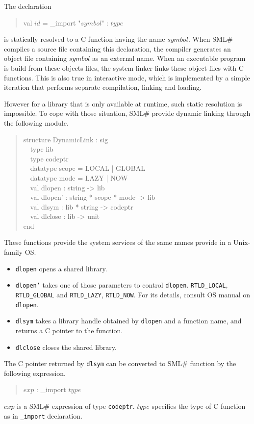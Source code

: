 \documentclass{jbook}
\newcommand{\smlsharp}{SML\#}
\newcommand{\myem}{\mbox{\ \ }}
\newenvironment{program}{\begin{quote}\begin{tt}}%
                        {\end{tt}\end{quote}}
\begin{document}
	The declaration
\begin{program}
val $\mathit{id}$ = \_import "$\mathit{symbol}$" : $\mathit{type}$
\end{program}
is statically resolved to a C function having the name $\mathit{symbol}$.
	When \smlsharp{} compiles a source file containing this
declaration, the compiler generates an object file containing $\mathit{symbol}$
as an external name.
	When an executable program is build from these objects files,
the system linker links these object files with C functions.
	This is also true in interactive mode, which is implemented by
a simple iteration that performs separate compilation, linking and
loading.

	However for a library that is only available at runtime, such
static resolution  is impossible.
	To cope with those situation, \smlsharp{} provide dynamic
linking through the following module.
\begin{program}
structure DynamicLink : sig\\
\myem  type lib\\
\myem  type codeptr\\
\myem  datatype scope = LOCAL | GLOBAL\\
\myem  datatype mode = LAZY | NOW\\
\myem  val dlopen : string -> lib\\
\myem  val dlopen' : string * scope * mode -> lib\\
\myem  val dlsym : lib * string -> codeptr\\
\myem  val dlclose : lib -> unit\\
end
\end{program}
	These functions provide the system services of the same names
provide in a Unix-family OS.
\begin{itemize}
\item  {\tt dlopen} opens a shared library.
\item  {\tt dlopen'} takes one of those parameters to control {\tt dlopen}.
{\tt RTLD\_LOCAL}, {\tt RTLD\_GLOBAL} and
{\tt RTLD\_LAZY}, {\tt RTLD\_NOW}.
	For its details, consult OS manual on {\tt dlopen}.
\item {\tt dlsym} takes a library handle obtained by {\tt dlopen}
and a function name, and returns a C pointer to the function.
\item  {\tt dlclose} closes the shared library.
\end{itemize}
	The C pointer returned by {\tt dlsym} can be converted to 
\smlsharp{} function by the following expression.
\begin{program}
$\mathit{exp}$ : \_import $\mathit{type}$
\end{program}
	$\mathit{exp}$ is a \smlsharp{} expression of type {\tt codeptr}.
	$\mathit{type}$ specifies the type of C function as in {\tt \_import} declaration.
\end{document}
